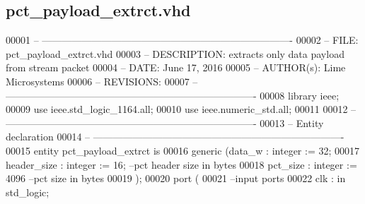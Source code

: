 \subsection{pct\+\_\+payload\+\_\+extrct.\+vhd}
\label{pct__payload__extrct_8vhd_source}

\begin{DoxyCode}
00001 \textcolor{keyword}{-- ---------------------------------------------------------------------------- }
00002 \textcolor{keyword}{-- FILE:    pct\_payload\_extrct.vhd}
00003 \textcolor{keyword}{-- DESCRIPTION: extracts only data payload from stream packet}
00004 \textcolor{keyword}{-- DATE:    June 17, 2016}
00005 \textcolor{keyword}{-- AUTHOR(s):   Lime Microsystems}
00006 \textcolor{keyword}{-- REVISIONS:}
00007 \textcolor{keyword}{-- ---------------------------------------------------------------------------- }
00008 \textcolor{vhdlkeyword}{library }\textcolor{keywordflow}{ieee};
00009 \textcolor{vhdlkeyword}{use }ieee.std\_logic\_1164.\textcolor{keywordflow}{all};
00010 \textcolor{vhdlkeyword}{use }ieee.numeric\_std.\textcolor{keywordflow}{all};
00011 
00012 \textcolor{keyword}{-- ----------------------------------------------------------------------------}
00013 \textcolor{keyword}{-- Entity declaration}
00014 \textcolor{keyword}{-- ----------------------------------------------------------------------------}
00015 \textcolor{keywordflow}{entity }pct_payload_extrct \textcolor{keywordflow}{is}
00016     \textcolor{keywordflow}{generic} \textcolor{vhdlchar}{(}\textcolor{vhdlchar}{data_w}         \textcolor{vhdlchar}{:} \textcolor{comment}{integer} \textcolor{vhdlchar}{:=} \textcolor{vhdllogic}{}\textcolor{vhdllogic}{32};
00017                 \textcolor{vhdlchar}{header_size}     \textcolor{vhdlchar}{:} \textcolor{comment}{integer} \textcolor{vhdlchar}{:=} \textcolor{vhdllogic}{}\textcolor{vhdllogic}{16};\textcolor{keyword}{ --pct header size in bytes }
00018                 \textcolor{vhdlchar}{pct_size}            \textcolor{vhdlchar}{:} \textcolor{comment}{integer} \textcolor{vhdlchar}{:=} \textcolor{vhdllogic}{}\textcolor{vhdllogic}{4096}\textcolor{keyword}{ --pct size in bytes}
00019         \textcolor{vhdlchar}{)};
00020   \textcolor{keywordflow}{port} \textcolor{vhdlchar}{(}
00021 \textcolor{keyword}{      --input ports }
00022         \textcolor{vhdlchar}{clk}                 \textcolor{vhdlchar}{:} \textcolor{keywordflow}{in} \textcolor{comment}{std\_logic};

\end{DoxyCode}

